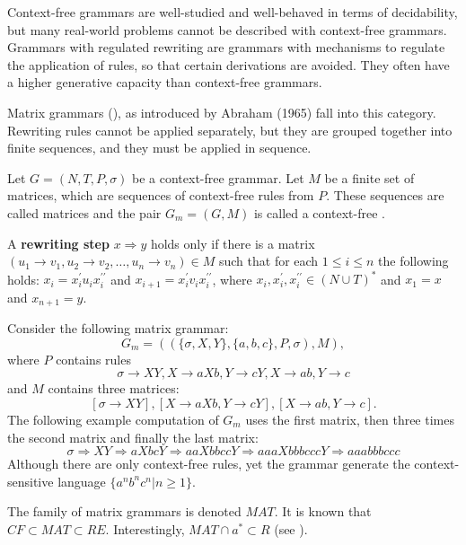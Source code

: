 Context-free grammars are well-studied and well-behaved in terms of decidability, but many real-world problems cannot be described with context-free grammars. Grammars with regulated rewriting are grammars with mechanisms to regulate the application of rules, so that certain derivations are avoided. They often have a higher generative capacity than context-free grammars.

Matrix grammars (\cite{Cremers73OnMatrixLanguages}), as introduced by Abraham (1965) fall into this category. Rewriting rules cannot be applied separately, but they are grouped together into finite sequences, and they must be applied in sequence.

\begin{definition}
Let $G = (N, T, P, \sigma)$ be a context-free grammar. Let $M$ be a finite set of matrices, which are sequences of context-free rules from $P$. These sequences are called matrices and the pair $G_m = (G, M)$ is called a context-free .
\end{definition}

\begin{definition}
A {\bf rewriting step} $x\Rightarrow y$ holds only if there is a matrix $(u_1\rightarrow v_1, u_2\rightarrow v_2, \ldots, u_n\rightarrow v_n) \in M$ such that for each $1\leq i\leq n$ the following holds: $x_i = x_i^{\prime}u_ix_i^{\prime\prime}$ and $x_{i+1} = x_i^{\prime}v_ix_i^{\prime\prime}$, where $x_i, x_i^{\prime}, x_i^{\prime\prime} \in (N\cup T)^*$ and $x_1 = x$ and $x_{n+1} = y$.
\end{definition}

\begin{example}
Consider the following matrix grammar:
$$G_m=((\{\sigma, X,Y\}, \{ a,b,c\}, P, \sigma), M),$$
where $P$ contains rules
$$\sigma\rightarrow XY, X\rightarrow aXb, Y\rightarrow cY, X\rightarrow ab, Y\rightarrow c$$
and $M$ contains three matrices:
$$[\sigma\rightarrow XY], [X\rightarrow aXb, Y\rightarrow cY], [X\rightarrow ab, Y\rightarrow c].$$
The following example computation of $G_m$ uses the first matrix, then three times the second matrix and finally the last matrix:
$$\sigma\Rightarrow XY\Rightarrow aXbcY\Rightarrow aaXbbccY\Rightarrow aaaXbbbcccY\Rightarrow aaabbbccc$$
Although there are only context-free rules, yet the grammar generate the context-sensitive language $\{a^nb^nc^n|n\geq 1\}$.
\end{example}

The family of matrix grammars is denoted $MAT$. It is known that $CF \subset MAT \subset RE$. Interestingly, $MAT \cap {a}^* \subset R$ (see \cite{Besozzi:PhD:2004}).
